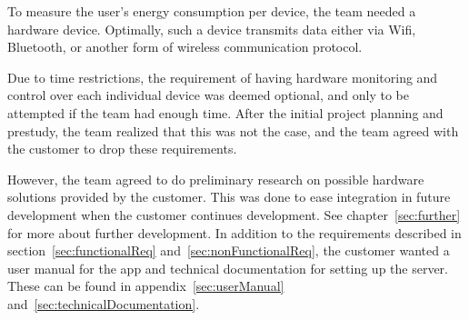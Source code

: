 \noindent To measure the user's energy consumption per device, the team needed a hardware device. Optimally, such a device transmits  data either via Wifi, Bluetooth, or another form of wireless communication protocol.

Due to time restrictions, the requirement of having hardware monitoring and control over each individual device was deemed optional, and only to be attempted if the team had enough time. After the initial project planning and prestudy, the team realized that this was not the case, and the team agreed with the customer to drop these requirements. 

However, the team agreed to do preliminary research on possible hardware solutions provided by the customer. This was done to ease integration in future development when the customer continues development. See chapter~\ref{sec:further} for more about further development. In addition to the requirements described in section~\ref{sec:functionalReq} and~\ref{sec:nonFunctionalReq}, the customer wanted a user manual for the app and technical documentation for setting up the server. These can be found in appendix~\ref{sec:userManual} and~\ref{sec:technicalDocumentation}.
\newpage
 
